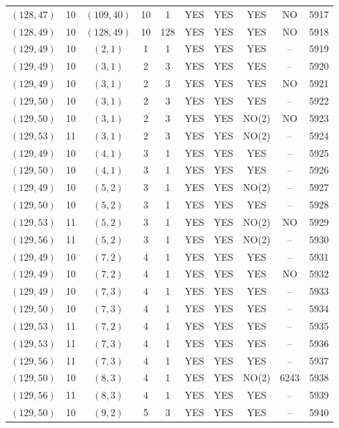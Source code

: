 \begin{longtable}{|c|c|c|c|c|c|c|c|c|c|}
$(128, 47)$ & 10 & $(109, 40)$ & 10 & 1 & YES & YES & YES & NO & 5917\\
$(128, 49)$ & 10 & $(128, 49)$ & 10 & 128 & YES & YES & YES & NO & 5918\\
$(129, 49)$ & 10 & $(2, 1)$ & 1 & 1 & YES & YES & YES & -- & 5919\\
$(129, 49)$ & 10 & $(3, 1)$ & 2 & 3 & YES & YES & YES & -- & 5920\\
$(129, 49)$ & 10 & $(3, 1)$ & 2 & 3 & YES & YES & YES & NO & 5921\\
$(129, 50)$ & 10 & $(3, 1)$ & 2 & 3 & YES & YES & YES & -- & 5922\\
$(129, 50)$ & 10 & $(3, 1)$ & 2 & 3 & YES & YES & NO(2) & NO & 5923\\
$(129, 53)$ & 11 & $(3, 1)$ & 2 & 3 & YES & YES & NO(2) & -- & 5924\\
$(129, 49)$ & 10 & $(4, 1)$ & 3 & 1 & YES & YES & YES & -- & 5925\\
$(129, 50)$ & 10 & $(4, 1)$ & 3 & 1 & YES & YES & YES & -- & 5926\\
$(129, 49)$ & 10 & $(5, 2)$ & 3 & 1 & YES & YES & NO(2) & -- & 5927\\
$(129, 50)$ & 10 & $(5, 2)$ & 3 & 1 & YES & YES & YES & -- & 5928\\
$(129, 53)$ & 11 & $(5, 2)$ & 3 & 1 & YES & YES & NO(2) & NO & 5929\\
$(129, 56)$ & 11 & $(5, 2)$ & 3 & 1 & YES & YES & NO(2) & -- & 5930\\
$(129, 49)$ & 10 & $(7, 2)$ & 4 & 1 & YES & YES & YES & -- & 5931\\
$(129, 49)$ & 10 & $(7, 2)$ & 4 & 1 & YES & YES & YES & NO & 5932\\
$(129, 49)$ & 10 & $(7, 3)$ & 4 & 1 & YES & YES & YES & -- & 5933\\
$(129, 50)$ & 10 & $(7, 3)$ & 4 & 1 & YES & YES & YES & -- & 5934\\
$(129, 53)$ & 11 & $(7, 2)$ & 4 & 1 & YES & YES & YES & -- & 5935\\
$(129, 53)$ & 11 & $(7, 3)$ & 4 & 1 & YES & YES & YES & -- & 5936\\
$(129, 56)$ & 11 & $(7, 3)$ & 4 & 1 & YES & YES & YES & -- & 5937\\
$(129, 50)$ & 10 & $(8, 3)$ & 4 & 1 & YES & YES & NO(2) & 6243 & 5938\\
$(129, 56)$ & 11 & $(8, 3)$ & 4 & 1 & YES & YES & YES & -- & 5939\\
$(129, 50)$ & 10 & $(9, 2)$ & 5 & 3 & YES & YES & YES & -- & 5940\\

\end{longtable}
